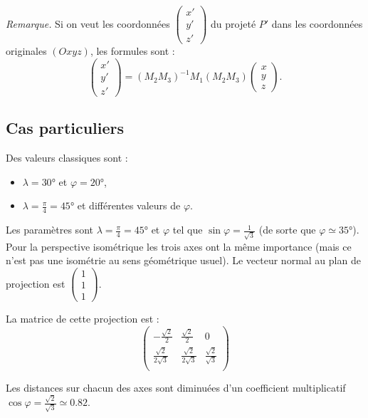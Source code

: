 \documentclass[11pt,class=report,crop=false]{standalone}
\begin{document}
\emph{Remarque.} Si on veut les coordonnées $\left(\begin{smallmatrix}x'\\y'\\z'\end{smallmatrix}\right)$ du projeté $P'$ dans les coordonnées originales $(Oxyz)$, les formules sont :
$$\begin{pmatrix}x'\\y'\\z'\end{pmatrix} 
= (M_2 M_3)^{-1} M_1  (M_2 M_3)
\begin{pmatrix}x\\y\\z\end{pmatrix}.$$


\subsection{Cas particuliers}

Des valeurs classiques sont :
\begin{itemize}
  \item $\lambda = \ang{30}$ et $\varphi = \ang{20}$,
  \item $\lambda = \frac\pi4 = \ang{45}$ et différentes valeurs de $\varphi$. 
\end{itemize}

\begin{exemple}
 
Les paramètres sont $\lambda = \frac\pi4 = \ang{45}$ et $\varphi$ tel que $\sin\varphi = \frac{1}{\sqrt3}$ (de sorte que $\varphi \simeq \ang{35}$).
Pour la perspective isométrique les trois axes ont la même importance (mais ce n'est pas une isométrie au sens géométrique usuel).
Le vecteur normal au plan de projection est $\left(\begin{smallmatrix}1\\1\\1\end{smallmatrix}\right)$.



La matrice de cette projection est :
$$\begin{pmatrix}
-\frac{\sqrt2}{2} & \frac{\sqrt2}{2} & 0 \\
\frac{\sqrt2}{2\sqrt3} & \frac{\sqrt2}{2\sqrt3} & \frac{\sqrt2}{\sqrt3} \\
\end{pmatrix}$$ 

Les distances sur chacun des axes sont diminuées d'un coefficient multiplicatif $\cos\varphi = \frac{\sqrt2}{\sqrt3} \simeq 0.82$.



\end{exemple}
\end{document}
